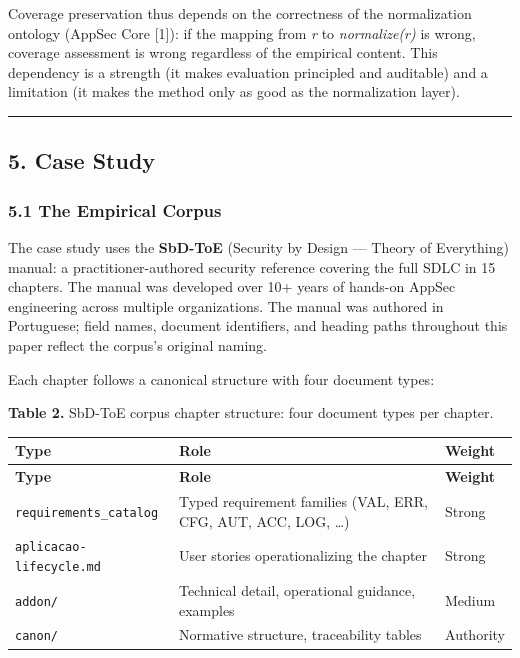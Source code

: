 \documentclass[
]{article}
\begin{document}
Coverage preservation thus depends on the correctness of the
normalization ontology (AppSec Core {[}1{]}): if the mapping from
\emph{r} to \emph{normalize(r)} is wrong, coverage assessment is wrong
regardless of the empirical content. This dependency is a strength (it
makes evaluation principled and auditable) and a limitation (it makes
the method only as good as the normalization layer).

\begin{center}\rule{0.5\linewidth}{0.5pt}\end{center}

\subsection{5. Case Study}\label{case-study}

\subsubsection{5.1 The Empirical Corpus}\label{the-empirical-corpus}

The case study uses the \textbf{SbD-ToE} (Security by Design --- Theory
of Everything) manual: a practitioner-authored security reference
covering the full SDLC in 15 chapters. The manual was developed over 10+
years of hands-on AppSec engineering across multiple organizations. The
manual was authored in Portuguese; field names, document identifiers,
and heading paths throughout this paper reflect the corpus's original
naming.

Each chapter follows a canonical structure with four document types:

\textbf{Table 2.} SbD-ToE corpus chapter structure: four document types
per chapter.

\begin{longtable}{@{}L{3.55cm}L{7.2cm}L{1.8cm}@{}}
\toprule
\textbf{Type} & \textbf{Role} & \textbf{Weight} \\
\midrule
\endfirsthead
\toprule
\textbf{Type} & \textbf{Role} & \textbf{Weight} \\
\midrule
\endhead
\bottomrule
\endfoot
\bottomrule
\endlastfoot
\texttt{requirements\_catalog} & Typed requirement families (VAL, ERR, CFG, AUT, ACC, LOG, \ldots) & Strong \\
\texttt{aplicacao-lifecycle.md} & User stories operationalizing the chapter & Strong \\
\texttt{addon/} & Technical detail, operational guidance, examples & Medium \\
\texttt{canon/} & Normative structure, traceability tables & Authority \\
\end{longtable}
\end{document}
